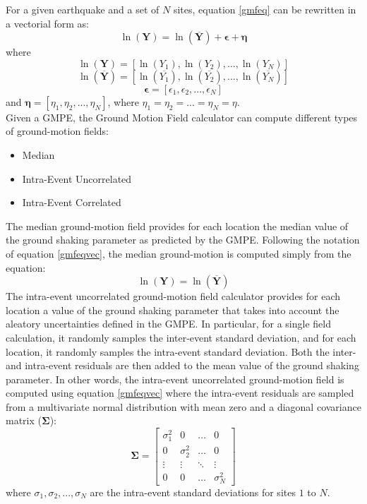 For a given earthquake and a set of $N$ sites, equation \ref{gmfeq} 
can be rewritten in a vectorial form as:
\begin{equation}
\ln (\bm{Y}) = \ln (\overline{\bm{Y}})+\bm{\epsilon}+\bm{\eta} 
\label{gmfeqvec}
\end{equation}
where 
\[
{\ln (\bm{Y})}=[\ln (Y_{1}), \ln (Y_{2}),...,\ln (Y_{N})]
\]
\[
\ln (\overline{\bm{Y}})=[\ln (\overline{Y_{1}}), 
\ln (\overline{Y_{2}}),...,\ln (\overline{Y_{N}})]
\]
\[
\bm{\epsilon}=[\epsilon_{1},\epsilon_{2},...,\epsilon_{N}]
\]
and $\bm{\eta}=[\eta_{1},\eta_{2},...,\eta_{N}]$, 
where $\eta_{1}=\eta_{2}=...=\eta_{N}=\eta$.\\
Given a GMPE, the Ground Motion Field calculator can compute different types 
of ground-motion fields:
\begin{itemize}
\item Median
\item Intra-Event Uncorrelated
\item Intra-Event Correlated
\end{itemize}
The median ground-motion field provides for each location the median value of 
the ground shaking parameter as predicted by the GMPE. Following the notation 
of equation \ref{gmfeqvec}, the median ground-motion is computed simply from 
the equation:
\begin{equation}
\ln (\bm{Y}) = \ln (\overline{\bm{Y}})
\end{equation}
The intra-event uncorrelated ground-motion field calculator provides for each 
location a value of the ground shaking parameter that takes into account 
the aleatory uncertainties defined in the GMPE. In particular, for a single 
field calculation, it randomly samples the inter-event standard deviation, 
and for each location, it randomly samples the intra-event standard deviation.
%
Both the inter- and intra-event residuals are then added to the mean value of 
the ground shaking parameter. In other words, the intra-event uncorrelated 
ground-motion field is computed using equation \ref{gmfeqvec} where the 
intra-event residuals are sampled from a multivariate normal distribution
with mean zero and a diagonal covariance matrix ($\bm{\Sigma}$):
\begin{equation}
\bm{\Sigma}=
\begin{bmatrix}
\sigma^{2}_{1} &  0  & \ldots & 0\\
0  &  \sigma^{2}_{2} & \ldots & 0\\
\vdots & \vdots & \ddots & \vdots\\
0  &   0       &\ldots & \sigma^{2}_{N}
\end{bmatrix}
\end{equation}
where $\sigma_{1}, \sigma_{2},...,\sigma_{N}$ are the intra-event standard 
deviations for sites $1$ to $N$.

